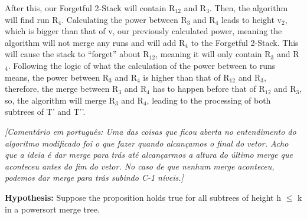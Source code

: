 \documentclass{article}
\begin{document}
After this, our Forgetful 2-Stack will contain R$_{12}$ and R$_3$. Then, the algorithm will find run R$_4$. Calculating the power between R$_3$ and R$_4$ leads to height v$_2$, which is bigger than that of v, our previously calculated power, meaning the algorithm will not merge any runs and will add R$_4$  to the Forgetful 2-Stack. This will cause the stack to “forget” about R$_{12}$, meaning it will only contain R$_3$ and R$_4$. Following the logic of what the calculation of the power between to runs means, the power between R$_3$ and R$_4$ is higher than that of R$_{12}$ and R$_3$, therefore, the merge between R$_3$ and R$_4$ has to happen before that of R$_{12}$ and R$_3$, so, the algorithm will merge R$_3$ and R$_4$, leading to the processing of both subtrees of T’ and T’’.  

\textit{[Comentário em português: Uma das coisas que ficou aberta no entendimento do algoritmo modificado foi o que fazer quando alcançamos o final do vetor. Acho que a ideia é dar merge para trás até alcançarmos a altura do último merge que aconteceu antes do fim do vetor. No caso de que nenhum merge aconteceu, podemos dar merge para trás subindo C-1 níveis.]}

\textbf{Hypothesis:}
Suppose the proposition holds true for all subtrees of height h $\leq$ k in a powersort merge tree.
\end{document}
